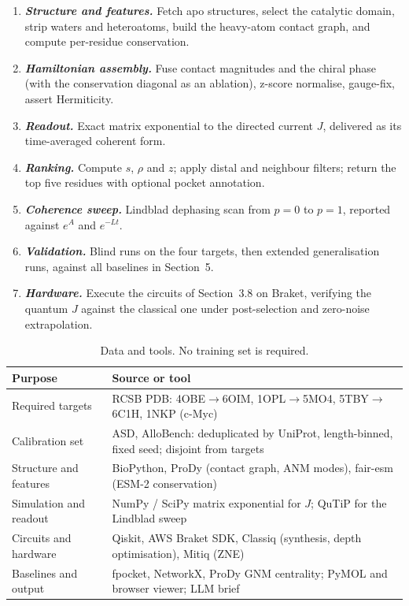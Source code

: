 \documentclass[10pt,a4paper]{article}
\newcommand{\lead}[1]{\textbf{\textit{#1}}}
\begin{document}
\begin{enumerate}
\item \lead{Structure and features.} Fetch apo structures, select the catalytic domain, strip waters
      and heteroatoms, build the heavy-atom contact graph, and compute per-residue conservation.
\item \lead{Hamiltonian assembly.} Fuse contact magnitudes and the chiral phase (with the
      conservation diagonal as an ablation), z-score normalise, gauge-fix, assert Hermiticity.
\item \lead{Readout.} Exact matrix exponential to the directed current $J$, delivered as its
      time-averaged coherent form.
\item \lead{Ranking.} Compute $s$, $\rho$ and $z$; apply distal and neighbour filters; return the top
      five residues with optional pocket annotation.
\item \lead{Coherence sweep.} Lindblad dephasing scan from $p = 0$ to $p = 1$, reported against
      $e^{A}$ and $e^{-Lt}$.
\item \lead{Validation.} Blind runs on the four targets, then extended generalisation runs, against
      all baselines in Section~5.
\item \lead{Hardware.} Execute the circuits of Section~3.8 on Braket, verifying the quantum $J$
      against the classical one under post-selection and zero-noise extrapolation.
\end{enumerate}

\begin{table}[t]
\caption{Data and tools. No training set is required.}
\small
\begin{tabularx}{\textwidth}{@{}lX@{}}
\toprule
\textbf{Purpose} & \textbf{Source or tool}\\
\midrule
Required targets & RCSB PDB: 4OBE$\to$6OIM, 1OPL$\to$5MO4, 5TBY$\to$6C1H, 1NKP (c-Myc)\\
Calibration set & ASD, AlloBench: deduplicated by UniProt, length-binned, fixed seed; disjoint from targets\\
Structure and features & BioPython, ProDy (contact graph, ANM modes), fair-esm (ESM-2 conservation)\\
Simulation and readout & NumPy / SciPy matrix exponential for $J$; QuTiP for the Lindblad sweep\\
Circuits and hardware & Qiskit, AWS Braket SDK, Classiq (synthesis, depth optimisation), Mitiq (ZNE)\\
Baselines and output & fpocket, NetworkX, ProDy GNM centrality; PyMOL and browser viewer; LLM brief\\
\bottomrule
\end{tabularx}
\end{table}
\end{document}

